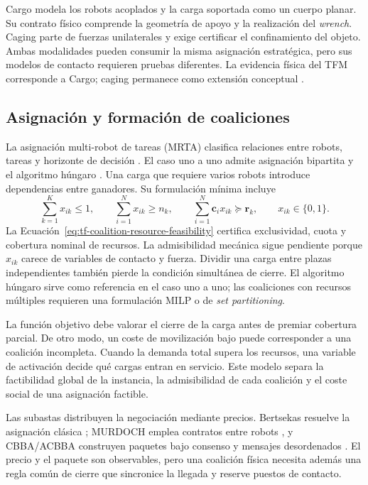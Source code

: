Cargo modela los robots acoplados y la carga soportada como un cuerpo planar. Su contrato físico comprende la geometría de apoyo y la realización del \emph{wrench}. Caging parte de fuerzas unilaterales y exige certificar el confinamiento del objeto. Ambas modalidades pueden consumir la misma asignación estratégica, pero sus modelos de contacto requieren pruebas diferentes. La evidencia física del TFM corresponde a Cargo; caging permanece como extensión conceptual \parencite{an2023cooperativeReview,rosenfelder2024force}.

\subsection{Asignación y formación de coaliciones}
\label{subsec:tf-mrta}

La asignación multi-robot de tareas (MRTA) clasifica relaciones entre robots, tareas y horizonte de decisión \parencite{gerkeyMataric2004MRTA,korsahStentzDias2013iTax}. El caso uno a uno admite asignación bipartita y el algoritmo húngaro \parencite{kuhn1955Hungarian}. Una carga que requiere varios robots introduce dependencias entre ganadores. Su formulación mínima incluye
\begin{equation}
  \sum_{k=1}^{K}x_{ik}\leq 1,\qquad
  \sum_{i=1}^{N}x_{ik}\geq n_k,\qquad
  \sum_{i=1}^{N}\boldsymbol c_i x_{ik}\succeq \boldsymbol r_k,
  \qquad x_{ik}\in\{0, 1\}.
  \label{eq:tf-coalition-resource-feasibility}
\end{equation}
La Ecuación~\eqref{eq:tf-coalition-resource-feasibility} certifica exclusividad, cuota y cobertura nominal de recursos. La admisibilidad mecánica sigue pendiente porque \(x_{ik}\) carece de variables de contacto y fuerza. Dividir una carga entre plazas independientes también pierde la condición simultánea de cierre. El algoritmo húngaro sirve como referencia en el caso uno a uno; las coaliciones con recursos múltiples requieren una formulación MILP o de \emph{set partitioning}.

La función objetivo debe valorar el cierre de la carga antes de premiar cobertura parcial. De otro modo, un coste de movilización bajo puede corresponder a una coalición incompleta. Cuando la demanda total supera los recursos, una variable de activación decide qué cargas entran en servicio. Este modelo separa la factibilidad global de la instancia, la admisibilidad de cada coalición y el coste social de una asignación factible.

Las subastas distribuyen la negociación mediante precios. Bertsekas resuelve la asignación clásica \parencite{bertsekas1988Auction}; MURDOCH emplea contratos entre robots \parencite{gerkeyMataric2002MURDOCH}, y CBBA/ACBBA construyen paquetes bajo consenso y mensajes desordenados \parencite{choiBrunetHow2009CBBA,johnson2011acbba}. El precio y el paquete son observables, pero una coalición física necesita además una regla común de cierre que sincronice la llegada y reserve puestos de contacto.


